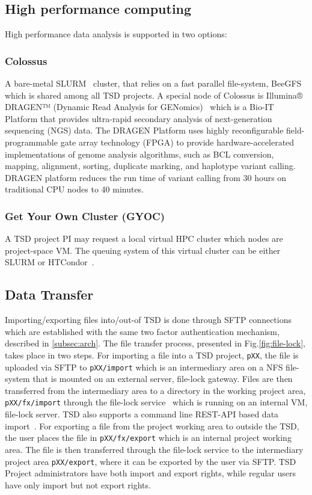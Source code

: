 \subsection{High performance computing}
\label{subsec:tsd-hpc}
High performance data analysis is supported in two options: 

\subsubsection{Colossus~\cite{colossus}}
\label{sec:colossus}
A bare-metal SLURM~\cite{slurm} cluster, that relies on a fast parallel file-system, BeeGFS~\cite{beegfs} which is shared among all TSD projects. A special node of Colossus is Illumina® DRAGEN™ (Dynamic Read Analysis for GENomics)~\cite{dragen} which is a Bio-IT Platform that provides ultra-rapid secondary analysis of next-generation sequencing (NGS) data. The DRAGEN Platform uses highly reconfigurable field-programmable gate array technology (FPGA) to provide hardware-accelerated implementations of genome analysis algorithms, such as BCL conversion, mapping, alignment, sorting, duplicate marking, and haplotype variant calling. DRAGEN platform reduces the run time of variant calling from 30 hours on traditional CPU nodes to 40 minutes. 

\subsubsection{Get Your Own Cluster (GYOC)}
\label{sec:gyoc}
A TSD project PI may request a local virtual HPC cluster which nodes are project-space VM. The queuing system of this virtual cluster can be either SLURM or HTCondor~\cite{condor-paper}. 

\subsection{Data Transfer}
\label{subsec:dataTransfer}

Importing/exporting files into/out-of TSD is done through SFTP connections which are established with the same two factor authentication mechanism, described in \ref{subsec:arch}. The file transfer process, presented in Fig.\ref{fig:file-lock}, takes place in two steps. For importing a file into a TSD project, \lstinline|pXX|, the file is uploaded via SFTP to \lstinline|pXX/import| which is an intermediary area on a NFS file-system that is mounted on an external server, file-lock gateway. Files are then transferred from the intermediary area to a directory in the working project area, \lstinline|pXX/fx/import| through the file-lock service~\cite{file-lock} which is running on an internal VM, file-lock server. TSD also supports a command line REST-API based data import~\cite{tsd-api}. For exporting a file from the project working area to outside the TSD, the user places the file in \lstinline|pXX/fx/export| which is an internal project working area. The file is then transferred through the file-lock service to the intermediary project area \lstinline|pXX/export|, where it can be exported by the user via SFTP. TSD Project administrators have both import and export rights, while regular users have only import but not export rights. 

